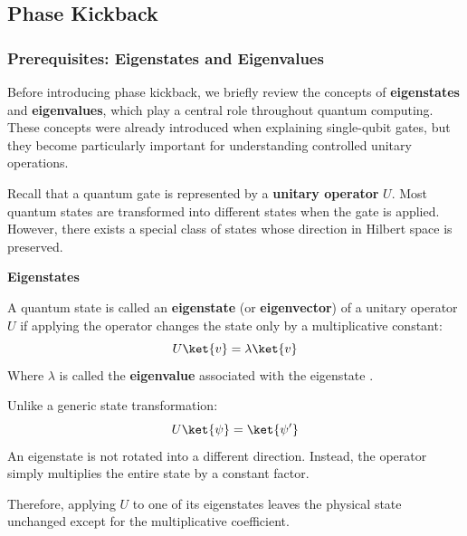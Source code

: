 \subsection{Phase Kickback}\label{sec:phase-kickback}

\subsubsection{Prerequisites: Eigenstates and Eigenvalues}\label{ex:prerequisites-eigenstates-and-eigenvalues}

Before introducing phase kickback, we briefly review the concepts of \textbf{eigenstates} and \textbf{eigenvalues}, which play a central role throughout quantum computing. These concepts were already introduced when explaining single-qubit gates, but they become particularly important for understanding controlled unitary operations.

\highspace
Recall that a quantum gate is represented by a \textbf{unitary operator} $U$. Most quantum states are transformed into different states when the gate is applied. However, there exists a special class of states whose direction in Hilbert space is preserved.

\highspace
\begin{flushleft}
    \textcolor{Green3}{ \textbf{Eigenstates}}
\end{flushleft}
A quantum state  is called an \textbf{eigenstate} (or \textbf{eigenvector}) of a unitary operator $U$ if applying the operator changes the state only by a multiplicative constant:
\begin{equation*}
    U\ket{v} = \lambda \ket{v}
\end{equation*}
Where $\lambda$ is called the \textbf{eigenvalue} associated with the eigenstate .

\highspace
Unlike a generic state transformation:
\begin{equation*}
    U\ket{\psi} = \ket{\psi'}
\end{equation*}
An eigenstate is not rotated into a different direction. Instead, the operator simply multiplies the entire state by a constant factor.

\highspace
Therefore, applying $U$ to one of its eigenstates leaves the physical state unchanged except for the multiplicative coefficient.

